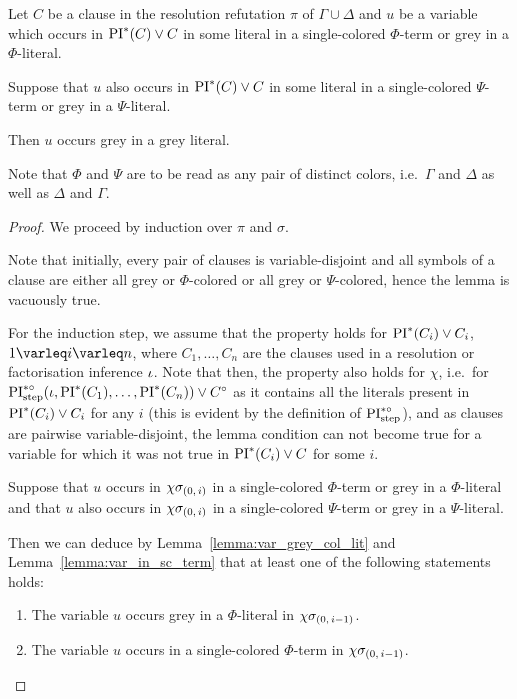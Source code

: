 \documentclass[,%
	draft=false,%
	numbers=noendperiod
	12pt,
	a4paper,
	oneside,%
	openany,
]{memoir}
\newcommand{\inv}{\ensuremath{\chi}}
\begin{document}
\begin{lemma}
	\label{lemma:col_change_and_grey_in_col_lit_star}
	Let $C$ be a clause in the resolution refutation $\pi$ of $\Gamma \cup \Delta$
	and $u$ be a variable which occurs in $\operatorname{PI}^*(C)\lor C$ in some literal in a single-colored $\Phi$-term or grey in a $\Phi$-literal.

	Suppose that $u$ also occurs in $\operatorname{PI}^*(C) \lor C$ in some literal in a single-colored $\Psi$-term or grey in a $\Psi$-literal.

	Then $u$ occurs grey in a grey literal.
\end{lemma}
Note that $\Phi$ and $\Psi$ are to be read as any pair of distinct colors, i.e.\ $\Gamma$ and $\Delta$ as well as $\Delta$ and $\Gamma$.
\begin{proof}
	We proceed by induction over $\pi$ and $\sigma$. 

	Note that initially, every pair of clauses is variable-disjoint and all symbols of a clause are either all grey or $\Phi$-colored or all grey or $\Psi$-colored, hence the lemma is vacuously true.

	For the induction step,
	we assume that the property holds for $\operatorname{PI}^*(C_i) \lor C_i$, $1\varleq i \varleq n$, where $C_1, \dots, C_n$ are the clauses used in a resolution or factorisation inference $\iota$.
	Note that then, the property also holds for $\inv$, i.e.\ for $\operatorname{PI}^{*\circ}_{\mathrm{step}}(\iota, \operatorname{PI}^*(C_1), \dots, \operatorname{PI}^*(C_n)) \lor C^\circ$
	as it contains all the literals present in $\operatorname{PI}^*(C_i) \lor C_i$ for any $i$ (this is evident by the definition of $\operatorname{PI}^{*\circ}_{\mathrm{step}}$), and as clauses are pairwise variable-disjoint, the lemma condition can not become true for a variable for which it was not true in $\operatorname{PI}^*(C_i)\lor C$ for some $i$.


	Suppose that $u$ occurs in $\chi\sigma_{(0,\,i)}$ in a single-colored $\Phi$-term or grey in a $\Phi$-literal and 
	that $u$ also occurs in $\chi\sigma_{(0,\,i)}$ in a single-colored $\Psi$-term or grey in a $\Psi$-literal.

	Then we can deduce by Lemma~\ref{lemma:var_grey_col_lit} and Lemma~\ref{lemma:var_in_sc_term} that at least one of the following statements holds:
	\begin{enumerate}
		\item
			\label{oozoh7Oh1}
			The variable $u$ occurs grey in a $\Phi$-literal in $\inv\sigmazmi$.

		\item
			\label{oozoh7Oh5}
			The variable $u$ occurs in a single-colored $\Phi$-term in $\inv\sigmazmi$.


\end{enumerate}
\end{proof}
\end{document}
